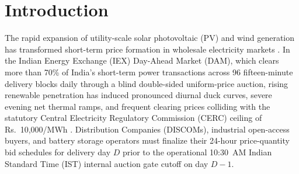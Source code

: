 \documentclass[runningheads,a4paper]{llncs}
\begin{document}
\begin{abstract}
\end{abstract}


\section{Introduction}
The rapid expansion of utility-scale solar photovoltaic (PV) and wind generation has transformed short-term price formation in wholesale electricity markets \cite{weron2014electricity,lago2021forecasting}. In the Indian Energy Exchange (IEX) Day-Ahead Market (DAM), which clears more than 70\% of India's short-term power transactions across 96 fifteen-minute delivery blocks daily through a blind double-sided uniform-price auction, rising renewable penetration has induced pronounced diurnal duck curves, severe evening net thermal ramps, and frequent clearing prices colliding with the statutory Central Electricity Regulatory Commission (CERC) ceiling of Rs.~10,000/MWh \cite{cerc2023order,iex2024market}. Distribution Companies (DISCOMs), industrial open-access buyers, and battery storage operators must finalize their 24-hour price-quantity bid schedules for delivery day $D$ prior to the operational 10:30~AM Indian Standard Time (IST) internal auction gate cutoff on day $D-1$.
\end{document}
